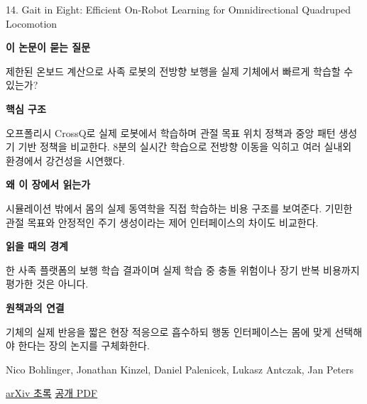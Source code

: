 \documentclass[11pt,openany]{book}
\begin{document}
\begin{termcard}{14. Gait in Eight: Efficient On-Robot Learning for Omnidirectional Quadruped Locomotion}

\par

\medskip

{\sffamily\bfseries\color{deepblue} 이 논문이 묻는 질문}\par

제한된 온보드 계산으로 사족 로봇의 전방향 보행을 실제 기체에서 빠르게 학습할 수 있는가?

\smallskip

{\sffamily\bfseries\color{deepblue} 핵심 구조}\par

오프폴리시 CrossQ로 실제 로봇에서 학습하며 관절 목표 위치 정책과 중앙 패턴 생성기 기반 정책을 비교한다. 8분의 실시간 학습으로 전방향 이동을 익히고 여러 실내외 환경에서 강건성을 시연했다.

\smallskip

{\sffamily\bfseries\color{deepblue} 왜 이 장에서 읽는가}\par

시뮬레이션 밖에서 몸의 실제 동역학을 직접 학습하는 비용 구조를 보여준다. 기민한 관절 목표와 안정적인 주기 생성이라는 제어 인터페이스의 차이도 비교한다.

\smallskip

{\sffamily\bfseries\color{coral} 읽을 때의 경계}\par

한 사족 플랫폼의 보행 학습 결과이며 실제 학습 중 충돌 위험이나 장기 반복 비용까지 평가한 것은 아니다.

\smallskip

{\sffamily\bfseries\color{teal} 원책과의 연결}\par

기체의 실제 반응을 짧은 현장 적응으로 흡수하되 행동 인터페이스는 몸에 맞게 선택해야 한다는 장의 논지를 구체화한다.

\medskip

{\footnotesize\color{muted} Nico Bohlinger, Jonathan Kinzel, Daniel Palenicek, Lukasz Antczak, Jan Peters\par

\href{https://arxiv.org/abs/2503.08375}{arXiv 초록} \quad \href{https://arxiv.org/pdf/2503.08375}{공개 PDF}\par}

\end{termcard}
\end{document}
